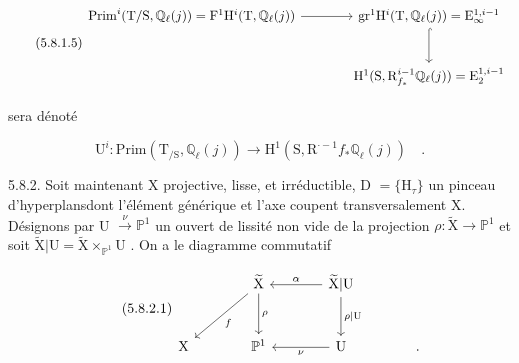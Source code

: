 \begin{equation}\tag{5.8.1.5}
\begin{tikzcd}[column sep=large, row sep=large]
\mathrm{Prim}^i(\mathrm{T} /\mathrm{S},\mathbb{Q}_\ell(j)) = \mathrm{F}^1\mathrm{H}^i(\mathrm{T},\mathbb{Q}_\ell(j)) \arrow[r] & \mathrm{gr}^1\mathrm{H}^i(\mathrm{T},\mathbb{Q}_\ell(j)) = \mathrm{E}_\infty^{1,i-1} \arrow[d, hook] \\
{} & \mathrm{H}^1(\mathrm{S},\mathrm{R}^{i-1}_{f_*}\mathbb{Q}_\ell(j)) = \mathrm{E}_2^{1,i-1}
\end{tikzcd}
\end{equation}

sera dénoté

\begin{equation}\tag{5.8.1.6}
\mathrm{U}^i : \mathrm{Prim}(\mathrm{T}_{/\mathrm{S}},\mathbb{Q}_\ell(j)) \longrightarrow \mathrm{H}^1(\mathrm{S},\mathrm{R}^{\cdot-1}f_*\mathbb{Q}_\ell(j)) \quad .
\end{equation}

5.8.2. Soit maintenant X projective, lisse, et irréductible, D $= \{\mathrm{H}_\tau\}$ un pinceau d'hyperplansdont l'élément générique et l'axe coupent transversalement X. Désignons par U $\overset{\nu}{\longrightarrow} \mathbb{P}^1$ un ouvert de lissité non vide de la projection $\rho : \widetilde{\mathrm{X}} \longrightarrow \mathbb{P}^1$ et soit $\widetilde{\mathrm{X}}|\mathrm{U} = \widetilde{\mathrm{X}} \times_{\mathbb{P}^1} \mathrm{U}$ . On a le diagramme commutatif

\begin{equation}\tag{5.8.2.1}
\begin{tikzcd}[column sep=large, row sep=large]
{} & \widetilde{\mathrm{X}} \arrow[dl, "f"] \arrow[d, "\rho"] & \widetilde{\mathrm{X}}|\mathrm{U} \arrow[l, "\alpha"'] \arrow[d, "\rho|\mathrm{U}"] \\
\mathrm{X} & \mathbb{P}^1 & \mathrm{U} \arrow[l, "\nu"] & .
\end{tikzcd}
\end{equation}



